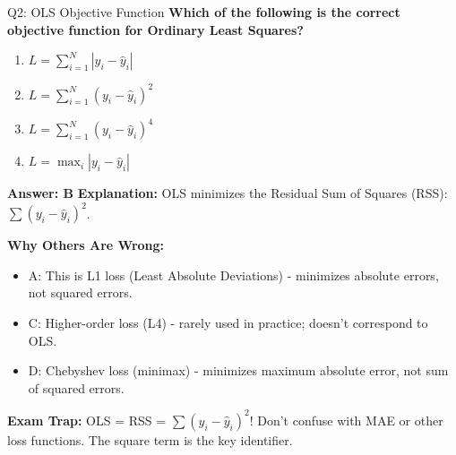 \documentclass[8pt]{beamer}
\begin{document}
	\begin{frame}{Q2: OLS Objective Function}
		\fontsize{6.5}{7.5}\selectfont
		\textbf{Which of the following is the correct objective function for Ordinary Least Squares?}
		
		\begin{enumerate}
			\item $L = \sum_{i=1}^N |y_i - \hat{y}_i|$
			\item $L = \sum_{i=1}^N (y_i - \hat{y}_i)^2$
			\item $L = \sum_{i=1}^N (y_i - \hat{y}_i)^4$
			\item $L = \max_i |y_i - \hat{y}_i|$
		\end{enumerate}
		
		\vspace{0.05cm}
		\textcolor{myblue}{\textbf{Answer: B}}
		\vspace{0.05cm}
		\textcolor{myblue}{\textbf{Explanation:}} OLS minimizes the Residual Sum of Squares (RSS): $\sum (y_i - \hat{y}_i)^2$.
		
		\vspace{0.05cm}
		\textcolor{myred}{\textbf{Why Others Are Wrong:}}
		\begin{itemize}
			\item \textcolor{myred}{A:} This is L1 loss (Least Absolute Deviations) - minimizes absolute errors, not squared errors.
			\item \textcolor{myred}{C:} Higher-order loss (L4) - rarely used in practice; doesn't correspond to OLS.
			\item \textcolor{myred}{D:} Chebyshev loss (minimax) - minimizes maximum absolute error, not sum of squared errors.
		\end{itemize}
		
		\textcolor{myred}{\textbf{Exam Trap:}} OLS = \textcolor{myblue}{RSS} = $\sum (y_i - \hat{y}_i)^2$! Don't confuse with MAE or other loss functions. The square term is the key identifier.
	\end{frame}
	
\end{document}
